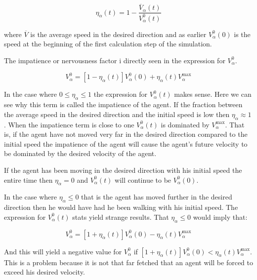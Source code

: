 \documentclass[danish,a4paper]{article}
\begin{document}
\begin{equation}
	\eta_{\alpha} \left( t \right) =
    1 - \frac{\overline{V}_{\alpha} \left( t \right)}
             {V_{\alpha}^{0} \left( t \right)}
\end{equation}

where $\overline{V}$ is the average speed in the desired direction and as 
earlier $V_{\alpha}^{0} \left( 0 \right)$ is the speed at the beginning of the 
first calculation step of the simulation.

The impatience or nervousness factor i directly seen in the expression for 
$V_{\alpha}^{0}$.

\begin{equation}
    V_{\alpha}^{0} = \left[ 1 - \eta_{\alpha} \left( t \right) \right] 
    V_{\alpha}^{0} \left( 0 \right) +
    \eta_{\alpha} \left( t \right)V_{\alpha}^{\text{max}}
\end{equation}

In the case where $0 \leq \eta_{\alpha} \leq 1$ the expression for 
$V_{\alpha}^{0} \left( t \right)$  makes sense. Here we can see why this term 
is called the impatience of the agent. If the fraction  between the average 
speed in the desired direction and the initial speed is low then $\eta_{\alpha} \approx 1$. 
When the impatience term is close to one $V_{\alpha}^{0} \left( t \right)$ 
is dominated by $V_{\alpha}^{\text{max}}$. That is, if the agent have not 
moved very far in the desired direction compared to the initial speed the 
impatience of the agent will cause the agent's future velocity to be dominated by 
the desired velocity of the agent.

If the agent has been moving in the desired direction with his initial 
speed the entire time then $\eta_{\alpha} = 0$  and 
$V_{\alpha}^{0} \left( t \right)$ will continue to be $V_{\alpha}^{0} \left( 0 \right)$.

In the case where $\eta_{\alpha} \leq 0$ that is the agent has moved further 
in the desired direction then he would have had he been walking with his 
initial speed. The expression for $V_{\alpha}^{0} \left( t \right)$
stats yield strange results. That $\eta_{\alpha} \leq 0$ would imply that:

\begin{equation}
    V_{\alpha}^{0} = \left[ 1 + \eta_{\alpha} \left( t \right) \right] 
    V_{\alpha}^{0} \left( 0 \right) -
    \eta_{\alpha} \left( t \right)V_{\alpha}^{\text{max}}
\end{equation}

And this will yield a negative value for $V_{\alpha}^{0}$ if $\left[ 1 + \eta_{\alpha} \left( t \right) \right] 
V_{\alpha}^{0} \left( 0 \right) < \eta_{\alpha} \left( t \right)V_{\alpha}^{\text{max}}$. 
This is a problem because it is not that far fetched that an agent will be 
forced to exceed his desired velocity.
\end{document}
